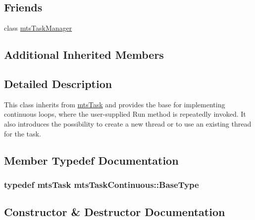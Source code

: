 \subsection*{Friends}
\begin{DoxyCompactItemize}
\item 
class \hyperlink{classmts_task_continuous_a21d47396ed8d4c10b5acd6a083b219f9}{mts\+Task\+Manager}
\end{DoxyCompactItemize}
\subsection*{Additional Inherited Members}


\subsection{Detailed Description}
This class inherits from \hyperlink{classmts_task}{mts\+Task} and provides the base for implementing continuous loops, where the user-\/supplied Run method is repeatedly invoked. It also introduces the possibility to create a new thread or to use an existing thread for the task. 

\subsection{Member Typedef Documentation}
\hypertarget{classmts_task_continuous_ab1c75a7d5ac83cba5bc21ebd4a31d804}{}
\subsubsection[{Base\+Type}]{\setlength{\rightskip}{0pt plus 5cm}typedef {\bf mts\+Task} {\bf mts\+Task\+Continuous\+::\+Base\+Type}}\label{classmts_task_continuous_ab1c75a7d5ac83cba5bc21ebd4a31d804}


\subsection{Constructor \& Destructor Documentation}
\hypertarget{classmts_task_continuous_aa4b574ad6b3400d74e0986658648c787}{}
